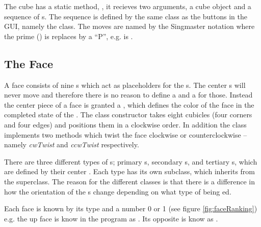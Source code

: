 The cube has a static method, , it recieves two arguments, a cube object and a sequence of \twist{}s. The \twist{} sequence is defined by the same class as the buttons in the GUI, namely the  class. The moves are named by the Singmaster notation \cite[p. 7]{Joyner02}  where the prime () is replaces by a ``P'', e.g.  is .




\subsection{The Face}
\label{sub:cubeFaces}
A face consists of nine \cubicle{}s which act as placeholders for the \cpiece{}s. The center \cpiece{}s will never move and therefore there is no reason to define a \cubicle{} and a \cpiece{} for those. Instead the center piece of a face is granted a \facelet{}, which defines the color of the face in the completed state of the \rubik{}.
The \face{} class constructor takes eight cubicles (four corners and four edges) and positions them in a clockwise order. In addition the \face{} class implements two methods which twist the face clockwise or counterclockwise -- namely \textit{cwTwist} and \textit{ccwTwist} respectively.

There are three different types of \face{}s; primary \face{}s, secondary \face{}s, and tertiary \face{}s, which are defined by their center \facelet{}.
Each type has its own subclass, which inherits from the \face{} superclass.
The reason for the different classes is that there is a difference in how the orientation of the \cubie{}s change depending on what type of \face{} being \twist{}ed.

Each face is known by its type and a number 0 or 1 (see figure \ref{fig:faceRanking}) e.g. the up face is know in the program as .
Its opposite is know as . 

